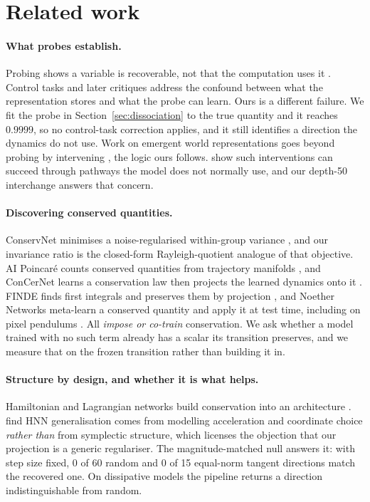 \section{Related work}
\label{sec:related}

\paragraph{What probes establish.}
Probing shows a variable is recoverable, not that the computation uses it \citep{alain2017probing}.
Control tasks \citep{hewitt2019control} and later critiques \citep{belinkov2022probing} address the
confound between what the representation stores and what the probe can learn. Ours is a different
failure. We fit the probe in Section~\ref{sec:dissociation} to the true quantity and it reaches
$0.9999$, so no control-task correction applies, and it still identifies a direction the dynamics do
not use. Work on emergent world representations goes beyond probing by intervening
\citep{li2023othello,nanda2023othello}, the logic ours follows. \citet{makelov2024illusion} show
such interventions can succeed through pathways the model does not normally use, and our depth-50
interchange answers that concern.

\paragraph{Discovering conserved quantities.}
ConservNet minimises a noise-regularised within-group variance \citep{ha2021conservnet}, and our
invariance ratio is the closed-form Rayleigh-quotient analogue of that objective. AI Poincar\'e
counts conserved quantities from trajectory manifolds \citep{liu2021aipoincare}, and ConCerNet
learns a conservation law then projects the learned dynamics onto it \citep{zhang2023concernet}.
FINDE finds first integrals and preserves them by projection \citep{matsubara2023finde}, and Noether
Networks meta-learn a conserved quantity and apply it at test time, including on pixel pendulums
\citep{alet2021noether}. All \emph{impose or co-train} conservation. We ask whether a model trained
with no such term already has a scalar its transition preserves, and we measure that on the frozen
transition rather than building it in.

\paragraph{Structure by design, and whether it is what helps.}
Hamiltonian and Lagrangian networks build conservation into an architecture
\citep{greydanus2019hnn,cranmer2020lnn}. \citet{gruver2022deconstructing} find HNN generalisation
comes from modelling acceleration and coordinate choice \emph{rather than} from symplectic
structure, which licenses the objection that our projection is a generic regulariser. The
magnitude-matched null answers it: with step size fixed, 0 of 60 random and 0 of 15 equal-norm
tangent directions match the recovered one. On dissipative models the pipeline returns a direction
indistinguishable from random.

